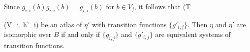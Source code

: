 Since $g_{i,i}(b)g_{i,i}(b) = g_{i,i}(b)$ for $b \in V_j$, it follows that (T

{(V_i, h'_i)} be an atlas of $\eta'$ with transition functions $\{g'_{i,j}\}$. Then $\eta$ and $\eta'$ are isomorphic over $B$ if and only if $\{g_{i,j}\}$ and $\{g'_{i,j}\}$ are equivalent systems of transition functions.
